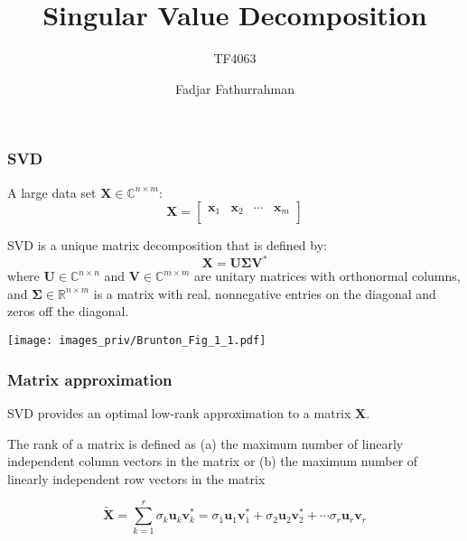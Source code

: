 \documentclass[english,10pt,aspectratio=169,fleqn]{beamer}
\begin{document}
\title{Singular Value Decomposition}
\subtitle{TF4063}
\author{Fadjar Fathurrahman}
\date{}


\frame{\titlepage}


\begin{frame} %
\frametitle{SVD}

A large data set $\mathbf{X} \in \mathbb{C}^{n \times m}$:
\begin{equation*}
\mathbf{X} = \begin{bmatrix}
\mathbf{x}_{1} & \mathbf{x}_{2} & \cdots & \mathbf{x}_{m} \\
\end{bmatrix}
\end{equation*}

SVD is a unique matrix decomposition that is defined by:
\begin{equation*}
\mathbf{X} = \mathbf{U}\boldsymbol{\Sigma}\mathbf{V}^{*}
\end{equation*}
where $\mathbf{U} \in \mathbb{C}^{n \times n}$ and
$\mathbf{V} \in \mathbb{C}^{m \times m}$ are unitary matrices with orthonormal
columns, and $\boldsymbol{\Sigma} \in \mathbb{R}^{n \times m}$ is a matrix with
real, nonnegative entries on the diagonal and zeros off the diagonal.

\end{frame} %


\begin{frame}[plain]

\texttt{[image: images\_priv/Brunton\_Fig\_1\_1.pdf]}

\end{frame}


\begin{frame}
\frametitle{Matrix approximation}

SVD provides an optimal low-rank approximation to a matrix $\mathbf{X}$.

The rank of a matrix is defined as (a) the maximum number of
linearly independent column vectors in the matrix or
(b) the maximum number of linearly independent row vectors in the matrix

\begin{equation*}
\tilde{\mathbf{X}} = \sum_{k=1}^{r} \sigma_{k} \mathbf{u}_{k} \mathbf{v}^{*}_{k}
= \sigma_{1} \mathbf{u}_{1} \mathbf{v}^{*}_{1} +
\sigma_{2} \mathbf{u}_{2} \mathbf{v}^{*}_{2} + \cdots
\sigma_{r} \mathbf{u}_{r} \mathbf{v}_{r}
\end{equation*}

\end{frame}
\end{document}
